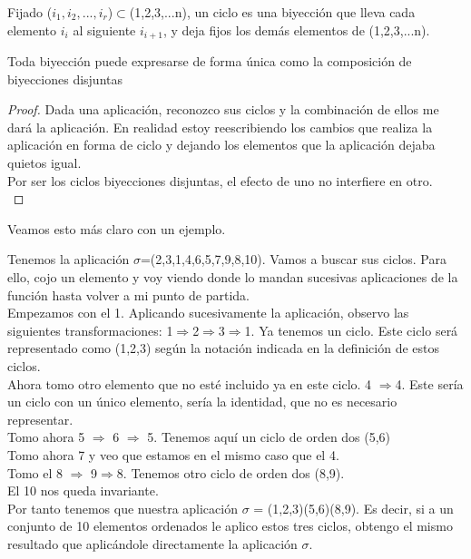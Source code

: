 \documentclass[nochap]{apuntes}
\begin{document}
\begin{defn}[Ciclo]
Fijado ($i_1, i_2,...,i_r$)$\subset$(1,2,3,...n), un ciclo es una biyección que lleva cada elemento $i_i$  al siguiente $i_{i+1}$, y deja
fijos los demás elementos de (1,2,3,...n).
\end{defn}

\begin{theorem}
 Toda biyección puede expresarse de forma única como la composición de biyecciones disjuntas
\end{theorem}
\begin{proof}
 Dada una aplicación, reconozco sus ciclos y la combinación de ellos me dará la aplicación. En realidad estoy reescribiendo los
 cambios que realiza la aplicación en forma de ciclo y dejando los elementos que la aplicación dejaba quietos igual. \\
 Por ser los ciclos biyecciones disjuntas, el efecto de uno no interfiere en otro.\\
\end{proof}
Veamos esto más claro con un ejemplo.
\begin{example}
 Tenemos la aplicación $\sigma$=(2,3,1,4,6,5,7,9,8,10). Vamos a buscar sus ciclos. Para ello, cojo un elemento y voy viendo donde
 lo mandan sucesivas aplicaciones de la función hasta volver a mi punto de partida.\\
 Empezamos con el 1. Aplicando sucesivamente la aplicación, observo las siguientes transformaciones: 1$\Rightarrow$2$\Rightarrow$3$\Rightarrow$1. Ya
 tenemos un ciclo. Este ciclo será representado como (1,2,3) según la notación indicada en la definición de estos ciclos.\\
 Ahora tomo otro elemento que no esté incluido ya en este ciclo. 4 $\Rightarrow$4. Este sería un ciclo con un único elemento, sería
 la identidad, que no es necesario representar.\\
 Tomo ahora 5 $\Rightarrow$ 6 $\Rightarrow$ 5. Tenemos aquí un ciclo de orden dos (5,6)\\
 Tomo ahora 7 y veo que estamos en el mismo caso que el 4.\\
 Tomo el 8 $\Rightarrow$ 9$\Rightarrow$8. Tenemos otro ciclo de orden dos (8,9).\\
 El 10 nos queda invariante.\\
 Por tanto tenemos que nuestra aplicación $\sigma$ = (1,2,3)(5,6)(8,9). Es decir, si a un conjunto de 10 elementos ordenados le aplico
 estos tres ciclos, obtengo el mismo resultado que aplicándole directamente la aplicación $\sigma$.
\end{example}
\end{document}
